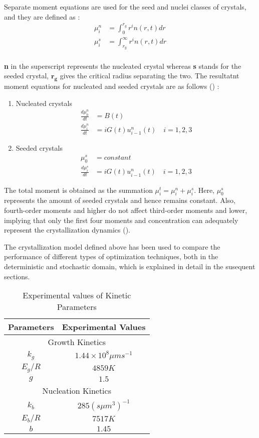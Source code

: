 \documentclass[3p,times,authoryear]{elsarticle}
\begin{document}
Separate moment equations are used for the seed and nuclei classes of crystals, and they are defined as : \\
\begin{align}
\mu^{n}_{i} &= \int_{0}^{r_{g}} r^{i}n(r,t) dr \\
\mu^{s}_{i} &= \int_{r_{g}}^{\infty} r^{i}n(r,t) dr
\end{align} \\
\textbf{n} in the superscript represents the nucleated crystal whereas \textbf{s} stands for the seeded crystal, $\boldsymbol{r_{g}}$ gives the critical radius separating the two. The resultatnt moment equations for nucleated and seeded crystals are as follows (\cite{yenkie}) :

\begin{enumerate}

\item Nucleated crystals
\begin{align}
\frac{d\mu_{0}^{n}}{dt} &= B(t) \label{g1} \\
\frac{d\mu_{i}^{n}}{dt} &= iG(t)u_{i-1}^{n}(t) \quad  i = 1,2,3
\end{align}

\item Seeded crystals
\begin{align}
\mu_{0}^{s} &= constant  \label{seed} \\ 
\frac{d\mu_{i}^{s}}{dt} &= iG(t)u_{i-1}^{n}(t) \quad  i = 1,2,3  \label{n1} 
\end{align}
\end{enumerate}
The total moment is obtained as the summation $\mu_{i}^{t} = \mu_{i}^{n} + \mu_{i}^{s}$. Here, $\mu_{0}^{s}$ represents the amount of seeded crystals and hence remains constant. Also, fourth-order moments and higher do not affect third-order moments and lower, implying that only the first four moments and concentration can adequately represent the crystallization dynamics (\cite{shi}). 
\par
The crystallization model defined above has been used to compare the performance of different types of optimization techniques, both in the deterministic and stochastic domain, which is explained in detail in the susequent sections.
\begin{center}
\begin{table}[!h]
\centering
\caption{Experimental values of Kinetic Parameters}
\begin{tabular}{|c|c|}
\hline
Parameters & Experimental Values \\
\hline
\multicolumn{2}{|c|}{Growth Kinetics} \\
\hline
$k_{g}$ & $1.44\times10^{8} \mu m s^{-1}$ \\
$E_{g}/R$ & $4859K$ \\
$g$ & $1.5$ \\
\hline
\multicolumn{2}{|c|}{Nucleation Kinetics} \\
\hline
$k_{b}$ & $285 (s \mu m^{3})^{-1}$ \\ 
$E_{b}/R$ & $7517K$ \\
$b$ & $1.45$ \\
\hline
\end{tabular}
\label{Table1}
\end{table}
\end{center}
\end{document}
